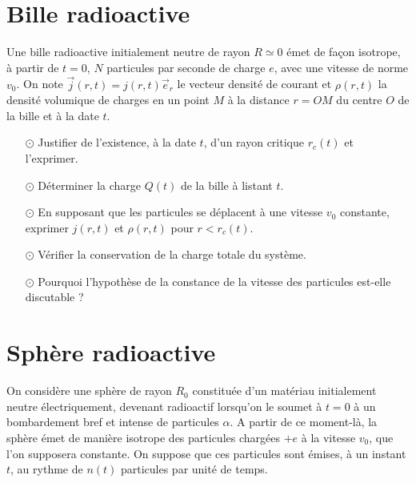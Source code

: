 \documentclass{report}
\begin{document}
\newpage

\section*{Bille radioactive}

Une bille radioactive initialement neutre de rayon $R\simeq0$ émet de façon isotrope, à partir de $t=0$, $N$ particules par seconde de charge $e$, avec une vitesse de norme $v_0$. On note $\vec{j}(r,t)=j(r,t)\vec{e}_r$ le vecteur densité de courant et $\rho(r,t)$ la densité volumique de charges en un point $M$ à la distance $r=OM$ du centre $O$ de la bille et à la date $t$.

\begin{itemize}

	\item[$\odot$] Justifier de l'existence, à la date $t$, d'un rayon critique $r_c(t)$ et l'exprimer.
	
	\item[$\odot$] Déterminer la charge $Q(t)$ de la bille à listant $t$.
	
	\item[$\odot$] En supposant que les particules se déplacent à une vitesse $v_0$ constante, exprimer $j(r,t)$ et $\rho(r,t)$ pour $r<r_c(t)$.
	
	\item[$\odot$]  Vérifier la conservation de la charge totale du système.
	
	\item[$\odot$] Pourquoi l'hypothèse de la constance de la vitesse des particules est-elle discutable ?
	
\end{itemize}

\newpage

\section*{Sphère radioactive}

On considère une sphère de rayon $R_0$ constituée d'un matériau initialement neutre électriquement, devenant radioactif lorsqu'on le soumet à $t=0$ à un bombardement bref et intense de particules $\alpha$. A partir de ce moment-là, la sphère émet de manière isotrope des particules chargées $+e$ à la vitesse $v_0$, que l'on supposera constante. On suppose que ces particules sont émises, à un instant $t$, au rythme de $n(t)$ particules par unité de temps.
\end{document}
